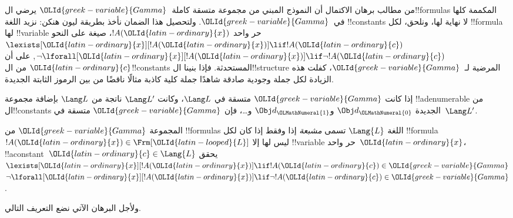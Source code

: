 \documentclass[../../../include/open-logic-section]{subfiles}
\begin{document}


\begin{explain}
من مطالب برهان الاكتمال أن النموذج المبني من مجموعة متسقة
كاملة~${\OLId{greek-variable}{Gamma}}$ يرضي ال!!{formula}s المكممة كلها في~${\OLId{greek-variable}{Gamma}}$.
ولتحصيل هذا الضمان نأخذ بطريقة ليون هنكن: نزيد اللغة
!!{constant}s لا نهاية لها، ونلحق، لكل !!{formula} لها
!!{variable} حر واحد $!A({\OLId{latin-ordinary}{x}})$، صيغة على النحو
      {$\lexists[{\OLId{latin-ordinary}{x}}][!A({\OLId{latin-ordinary}{x}})] \lif !A({\OLId{latin-ordinary}{c}})$}
      {$\lnot\lforall[{\OLId{latin-ordinary}{x}}][!A({\OLId{latin-ordinary}{x}})] \lif \lnot !A({\OLId{latin-ordinary}{c}})$},
على أن ${\OLId{latin-ordinary}{c}}$ من ال!!{constant}s المستحدثة. فإذا بنينا ال!!{structure}
المرضية لـ~${\OLId{greek-variable}{Gamma}}$، كفلت هذه الزيادة لكل
{جملة وجودية صادقة شاهدًا}
{جملة كلية كاذبة مثالًا ناقضًا}
من بين الرموز الثابتة الجديدة.
\end{explain}

\begin{prop}
إذا كانت ${\OLId{greek-variable}{Gamma}}$ متسقة في $\Lang L$، وكانت $\Lang L'$ ناتجة من
$\Lang L$ بإضافة مجموعة !!a{denumerable} من ال!!{constant}s الجديدة
$\Obj d_{\OLMathNumeral{0}}$ و$\Obj d_{\OLMathNumeral{1}}$ و\dots، فإن ${\OLId{greek-variable}{Gamma}}$ متسقة في~$\Lang L'$.
\end{prop}

\begin{defn}
المجموعة ${\OLId{greek-variable}{Gamma}}$ من !!{formula}s اللغة $\Lang {L}$ تسمى
\emph{مشبعة} إذا وفقط إذا كان لكل !!{formula}~$!A({\OLId{latin-ordinary}{x}}) \in \Frm[{\OLId{latin-looped}{L}}]$
ليس لها إلا !!{variable} حر واحد~${\OLId{latin-ordinary}{x}}$، !!a{constant}~${\OLId{latin-ordinary}{c}} \in \Lang{L}$ يحقق
      {$\lexists[{\OLId{latin-ordinary}{x}}][!A({\OLId{latin-ordinary}{x}})] \lif !A({\OLId{latin-ordinary}{c}}) \in {\OLId{greek-variable}{Gamma}}$}
      {$\lnot\lforall[{\OLId{latin-ordinary}{x}}][!A({\OLId{latin-ordinary}{x}})] \lif \lnot !A({\OLId{latin-ordinary}{c}}) \in {\OLId{greek-variable}{Gamma}}$}.
\end{defn}

ولأجل البرهان الآتي نضع التعريف التالي.
\end{document}
